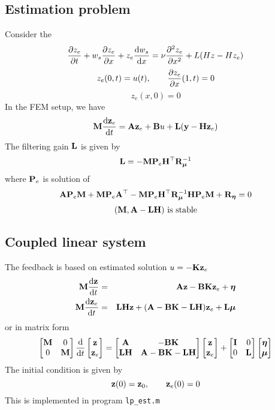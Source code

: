 \documentclass[12pt]{article}
\begin{document}

\subsection{Estimation problem}
Consider the 
\begin{equation}
\df{z_e}{t} + w_s \df{z_e}{x} + z_e \dd{w_s}{x} = \nu \df{^2 z_e}{x^2} + L( H z - H z_e )
\end{equation}
\begin{equation}
z_e(0,t) = u(t), \qquad \df{z_e}{x}(1,t) = 0
\end{equation}
\begin{equation}
z_e(x,0) = 0
\end{equation}
In the FEM setup, we have
\[
\M \dd{\z_e}{t} = \A \z_e + \B u + \bL(\y - \bH \z_e)
\]
The filtering gain $\bL$ is given by 
\[
\bL = - \M \bdP_e \bH^\top \R^{-1}_{\boldsymbol\mu}
\]
where $\bdP_e$ is solution of
\[
\A \bdP_e \M + \M \bdP_e \A^\top - \M \bdP_e \bH^\top \R_{\boldsymbol\mu}^{-1}  \bH \bdP_e \M + \R_{\boldsymbol\eta}  = 0
\]
\[
 (\M,\A - \bL \bH) \text{ is stable} 
\]


\subsection{Coupled linear system}
The feedback is based on estimated solution $u = -\K \z_e$
\begin{eqnarray*}
\M \dd{\z}{t} &=& \A \z - \B \K \z_e + \boldsymbol\eta \\
\M \dd{\z_e}{t} &=& \bL \bH \z + (\A - \B \K - \bL \bH) \z_e + \bL \boldsymbol\mu
\end{eqnarray*}
or in matrix form
\[\begin{bmatrix}
   \M & 0\\
   0 & \M \\
  \end{bmatrix}
\dd{}{t} \begin{bmatrix}
\z \\
\z_e \end{bmatrix} = \begin{bmatrix}
\A & -\B \K \\
\bL \bH & \A - \B \K - \bL \bH \end{bmatrix} \begin{bmatrix}
\z \\ \z_e \end{bmatrix} + \begin{bmatrix}
\I & 0 \\
0 & \bL \end{bmatrix} \begin{bmatrix}
\boldsymbol\eta \\ \boldsymbol\mu \end{bmatrix}
\]
The initial condition is given by
\[
\z(0) = \z_0, \qquad \z_e(0) = 0
\]
This is implemented in program {\tt lp\_est.m}
\end{document}
